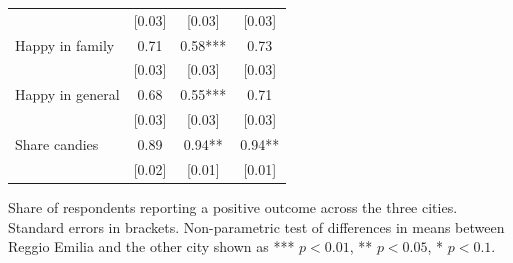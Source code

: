 \documentclass[12pt]{article}
\begin{document}
\begin{table}[ht]
\begin{tabular}{lccc}
& [0.03] & [0.03] & [0.03] \\ 
Happy in family & 0.71 & 0.58*** & 0.73 \\ 
& [0.03] & [0.03] & [0.03] \\ 
Happy in general & 0.68 & 0.55*** & 0.71 \\ 
& [0.03] & [0.03] & [0.03] \\ 
Share candies & 0.89 & 0.94** & 0.94** \\ 
& [0.02] & [0.01] & [0.01] \\ \hline
\end{tabular}%
{\footnotesize \raggedright{Share of respondents reporting a positive
outcome across the three cities. Standard errors in brackets. Non-parametric
test of differences in means between Reggio Emilia and the other city shown
as *** $p<0.01$, ** $p<0.05$, * $p<0.1$.} }
\end{table}
\end{document}
